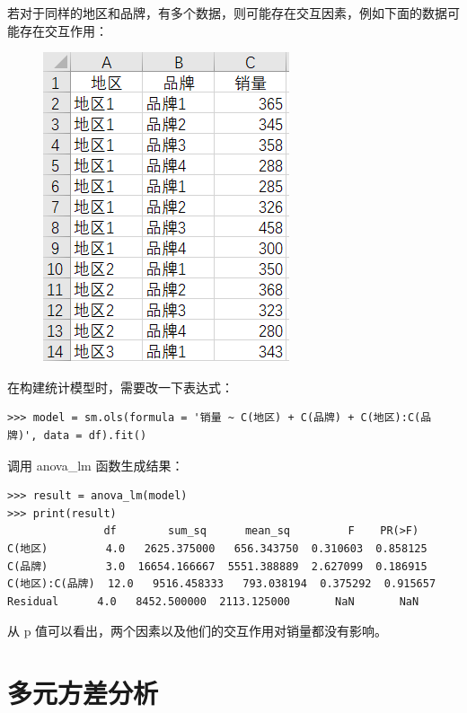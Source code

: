 若对于同样的地区和品牌，有多个数据，则可能存在交互因素，例如下面的数据可能存在交互作用：

\begin{figure}[ht]
  \centering
  \includegraphics[scale=0.8]{figure/chapter3/twoFactor3.png}
\end{figure}


在构建统计模型时，需要改一下表达式：

\begin{lstlisting}[Language=Python]
>>> model = sm.ols(formula = '销量 ~ C(地区) + C(品牌) + C(地区):C(品牌)', data = df).fit()
\end{lstlisting}

调用 anova\_lm 函数生成结果：

\begin{lstlisting}[Language=Python]
>>> result = anova_lm(model)
>>> print(result)
               df        sum_sq      mean_sq         F    PR(>F)
C(地区)         4.0   2625.375000   656.343750  0.310603  0.858125
C(品牌)         3.0  16654.166667  5551.388889  2.627099  0.186915
C(地区):C(品牌)  12.0   9516.458333   793.038194  0.375292  0.915657
Residual      4.0   8452.500000  2113.125000       NaN       NaN
\end{lstlisting}

从 p 值可以看出，两个因素以及他们的交互作用对销量都没有影响。


\section{多元方差分析}
